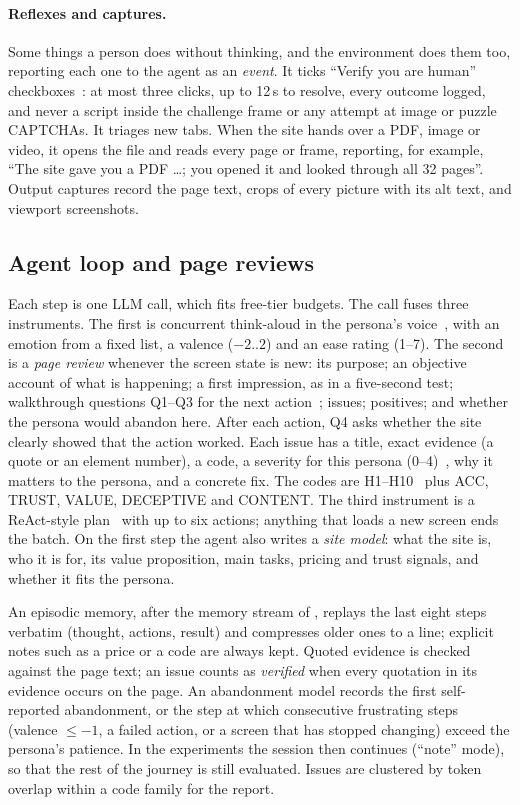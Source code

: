 \documentclass[10pt,twocolumn]{article}
\begin{document}
\paragraph{Reflexes and captures.} Some things a person does without thinking, and the environment does them too, reporting each one to the agent as an \emph{event}. It ticks ``Verify you are human'' checkboxes~\cite{turnstile}: at most three clicks, up to 12\,s to resolve, every outcome logged, and never a script inside the challenge frame or any attempt at image or puzzle CAPTCHAs. It triages new tabs. When the site hands over a PDF, image or video, it opens the file and reads every page or frame, reporting, for example, ``The site gave you a PDF \ldots; you opened it and looked through all 32 pages''. Output captures record the page text, crops of every picture with its alt text, and viewport screenshots.

\subsection{Agent loop and page reviews}
\label{sec:agent}

Each step is one LLM call, which fits free-tier budgets. The call fuses three instruments. The first is concurrent think-aloud in the persona's voice~\cite{ericsson1993protocol}, with an emotion from a fixed list, a valence ($-2$..$2$) and an ease rating (1--7). The second is a \emph{page review} whenever the screen state is new: its purpose; an objective account of what is happening; a first impression, as in a five-second test; walkthrough questions Q1--Q3 for the next action~\cite{wharton1994cognitive}; issues; positives; and whether the persona would abandon here. After each action, Q4 asks whether the site clearly showed that the action worked. Each issue has a title, exact evidence (a quote or an element number), a code, a severity for this persona (0--4)~\cite{nielsen1994heuristic}, why it matters to the persona, and a concrete fix. The codes are H1--H10~\cite{nielsen1994heuristic} plus ACC, TRUST, VALUE, DECEPTIVE and CONTENT. The third instrument is a ReAct-style plan~\cite{yao2023react} with up to six actions; anything that loads a new screen ends the batch. On the first step the agent also writes a \emph{site model}: what the site is, who it is for, its value proposition, main tasks, pricing and trust signals, and whether it fits the persona.

An episodic memory, after the memory stream of \citet{park2023generative}, replays the last eight steps verbatim (thought, actions, result) and compresses older ones to a line; explicit notes such as a price or a code are always kept. Quoted evidence is checked against the page text; an issue counts as \emph{verified} when every quotation in its evidence occurs on the page. An abandonment model records the first self-reported abandonment, or the step at which consecutive frustrating steps (valence $\le -1$, a failed action, or a screen that has stopped changing) exceed the persona's patience. In the experiments the session then continues (``note'' mode), so that the rest of the journey is still evaluated. Issues are clustered by token overlap within a code family for the report.
\end{document}
